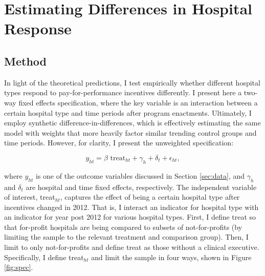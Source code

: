 \documentclass[12pt]{article}
\begin{document}
    \section{Estimating Differences in Hospital Response}

    \subsection{Method}

    In light of the theoretical predictions, I test empirically whether different hospital types respond to pay-for-performance incentives differently. I present here a two-way fixed effects specification, where the key variable is an interaction between a certain hospital type and time periods after program enactments. Ultimately, I employ synthetic difference-in-differences, which is effectively estimating the same model with weights that more heavily factor similar trending control groups and time periods. However, for clarity, I present the unweighted specification:

    \begin{equation}
    \label{eq:forprofit}
    y_{ht} = \beta \text{ treat}_{ht} + \gamma_{h} + \delta_t + \epsilon_{ht},
    \end{equation}
    

    \noindent where $y_{ht}$ is one of the outcome variables discussed in Section \ref{sec:data}, and $\gamma_h$ and $\delta_t$ are hospital and time fixed effects, respectively. The independent variable of interest, treat$_{ht}$, captures the effect of being a certain hospital type after incentives changed in 2012. That is, I interact an indicator for hospital type with an indicator for year post 2012 for various hospital types. First, I define treat so that for-profit hospitals are being compared to subsets of not-for-profits (by limiting the sample to the relevant treatment and comparison group). Then, I limit to only not-for-profits and define treat as those without a clinical executive. Specifically, I define treat$_{ht}$ and limit the sample in four ways, shown in Figure \ref{fig:spec}. 
\end{document}
